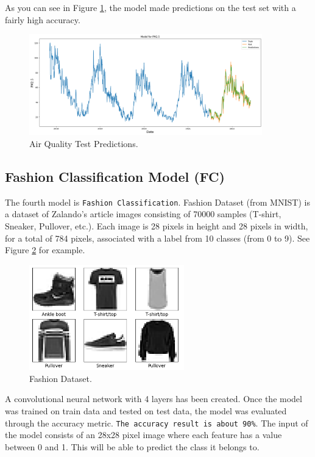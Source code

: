 \documentclass{article}
\begin{document}
As you can see in Figure \ref{fig:4}, the model made predictions on the test set with a fairly high accuracy.

\begin{figure}[H]
    \centering
    \includegraphics[width=0.9\textwidth]{AQ-Predictions.png}
    \caption{Air Quality Test Predictions.}
    \label{fig:4}
\end{figure}

\subsection{Fashion Classification Model (FC)}
The fourth model is \texttt{Fashion Classification}. Fashion Dataset (from MNIST) is a dataset of Zalando's article images consisting of 70000 samples (T-shirt, Sneaker, Pullover, etc.). Each image is 28 pixels in height and 28 pixels in width, for a total of 784 pixels, associated with a label from 10 classes (from 0 to 9). See Figure \ref{fig:5} for example. 

\begin{figure}[H]
    \centering
    \includegraphics[width=0.6\textwidth]{FC-Dataset.png}
    \caption{Fashion Dataset.}
    \label{fig:5}
\end{figure}

A convolutional neural network with 4 layers has been created. Once the model was trained on train data and tested on test data, the model was evaluated through the accuracy metric. \texttt{The accuracy result is about 90\%}. The input of the model consists of an 28x28 pixel image where each feature has a value between 0 and 1. This will be able to predict the class it belongs to.
\end{document}
